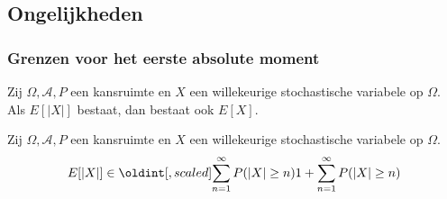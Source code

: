 \documentclass[main.tex]{subfiles}
\begin{document}
\subsection{Ongelijkheden}
\label{sec:ongelijkheden}

\subsubsection{Grenzen voor het eerste absolute moment}
\label{sec:grenzen-voor-het}

\begin{st}
  Zij $\Omega,\mathcal{A},P$ een kansruimte en $X$ een willekeurige stochastische variabele op $\Omega$.
  Als $E[|X|]$ bestaat, dan bestaat ook $E[X]$.
\end{st}

\begin{st}
  Zij $\Omega,\mathcal{A},P$ een kansruimte en $X$ een willekeurige stochastische variabele op $\Omega$.
  \[ E[|X|] \in \interval{\sum_{n=1}^{\infty}P(|X| \ge n)}{1 + \sum_{n=1}^{\infty}P(|X| \ge n)} \]


\end{st}
\end{document}
